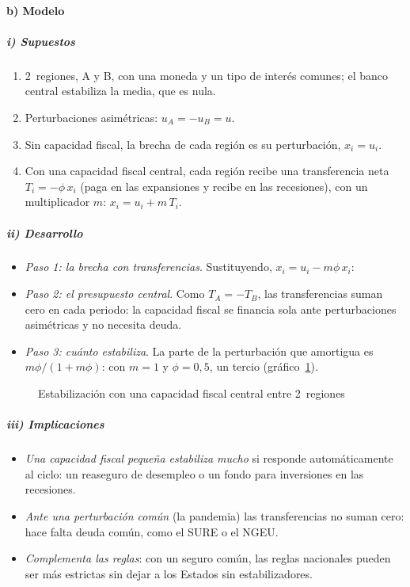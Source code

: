 \documentclass[11pt]{article}
\begin{document}
\paragraph{b) Modelo}

\subparagraph{i) Supuestos}

\begin{enumerate}
\item 2~regiones, A y B, con una moneda y un tipo de interés comunes; el banco central estabiliza la media, que es nula.
\item Perturbaciones asimétricas: $u_A=-u_B=u$.
\item Sin capacidad fiscal, la brecha de cada región es su perturbación, $x_i=u_i$.
\item Con una capacidad fiscal central, cada región recibe una transferencia neta $T_i=-\phi\,x_i$ (paga en las expansiones y recibe en las recesiones), con un multiplicador $m$: $x_i=u_i+m\,T_i$.
\end{enumerate}

\subparagraph{ii) Desarrollo}

\begin{itemize}
\item \emph{Paso 1: la brecha con transferencias}. Sustituyendo, $x_i=u_i-m\phi\,x_i$:
\item \emph{Paso 2: el presupuesto central}. Como $T_A=-T_B$, las transferencias suman cero en cada periodo: la capacidad fiscal se financia sola ante perturbaciones asimétricas y no necesita deuda.
\item \emph{Paso 3: cuánto estabiliza}. La parte de la perturbación que amortigua es $m\phi/(1+m\phi)$: con $m=1$ y $\phi=0{,}5$, un tercio (gráfico~\ref{fig:capacidad}).
\end{itemize}

\begin{figure}[H]
\centering
\caption{Estabilización con una capacidad fiscal central entre 2~regiones}\label{fig:capacidad}
\end{figure}

\subparagraph{iii) Implicaciones}

\begin{itemize}
\item \emph{Una capacidad fiscal pequeña estabiliza mucho} si responde automáticamente al ciclo: un reaseguro de desempleo o un fondo para inversiones en las recesiones.
\item \emph{Ante una perturbación común} (la pandemia) las transferencias no suman cero: hace falta deuda común, como el SURE o el NGEU.
\item \emph{Complementa las reglas}: con un seguro común, las reglas nacionales pueden ser más estrictas sin dejar a los Estados sin estabilizadores.
\end{itemize}
\end{document}
